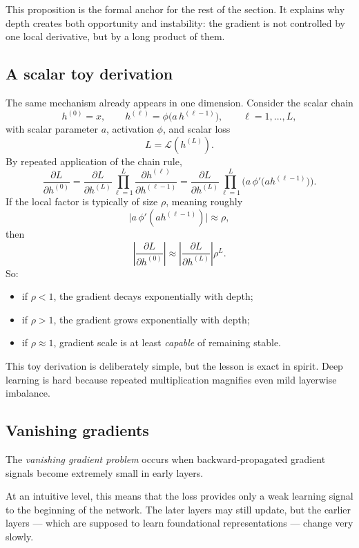 This proposition is the formal anchor for the rest of the section.
It explains why depth creates both opportunity and instability: the gradient is not controlled by one local derivative, but by a long product of them.

\subsection*{A scalar toy derivation}

The same mechanism already appears in one dimension.
Consider the scalar chain
\[
h^{(0)}=x,
\qquad
h^{(\ell)}=\phi\big(a\,h^{(\ell-1)}\big),
\qquad \ell=1,\dots,L,
\]
with scalar parameter \(a\), activation \(\phi\), and scalar loss
\[
L=\mathcal L(h^{(L)}).
\]
By repeated application of the chain rule,
\[
\frac{\partial L}{\partial h^{(0)}}
=
\frac{\partial L}{\partial h^{(L)}}
\prod_{\ell=1}^{L}
\frac{\partial h^{(\ell)}}{\partial h^{(\ell-1)}}
=
\frac{\partial L}{\partial h^{(L)}}
\prod_{\ell=1}^{L}
\Big(a\,\phi'\big(a h^{(\ell-1)}\big)\Big).
\]
If the local factor is typically of size \(\rho\), meaning roughly
\[
\big|a\,\phi'(a h^{(\ell-1)})\big|\approx \rho,
\]
then
\[
\left|\frac{\partial L}{\partial h^{(0)}}\right|
\approx
\left|\frac{\partial L}{\partial h^{(L)}}\right|\rho^L.
\]
So:
\begin{itemize}
    \item if \(\rho<1\), the gradient decays exponentially with depth;
    \item if \(\rho>1\), the gradient grows exponentially with depth;
    \item if \(\rho\approx 1\), gradient scale is at least \emph{capable} of remaining stable.
\end{itemize}

\medskip

This toy derivation is deliberately simple, but the lesson is exact in spirit.
Deep learning is hard because repeated multiplication magnifies even mild layerwise imbalance.

\subsection*{Vanishing gradients}

The \emph{vanishing gradient problem} occurs when backward-propagated gradient signals become extremely small in early layers.

\medskip

At an intuitive level, this means that the loss provides only a weak learning signal to the beginning of the network.
The later layers may still update, but the earlier layers --- which are supposed to learn foundational representations --- change very slowly.

